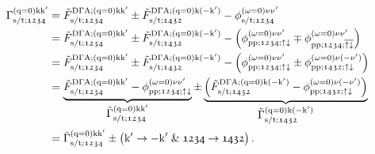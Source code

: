 \documentclass[main.tex]{subfiles}
\begin{document}
\begin{align}
\begin{split}
	\Gamma_{\text{s}/\text{t};\mathfrak{1234}}^{(\text{q}=0)\text{k}\text{k}'}&=\tilde{F}_{\text{s}/\text{t};\mathfrak{1234}}^{\text{D}\Gamma\text{A};(\text{q}=0)\text{k}\text{k}'}\pm \tilde{F}_{\text{s}/\text{t};\mathfrak{1432}}^{\text{D}\Gamma\text{A};(\text{q}=0)\text{k}(-\text{k}')}-\phi_{\text{s}/\text{t};\mathfrak{1234}}^{(\omega=0)\nu\nu'}\\
	&=\tilde{F}_{\text{s}/\text{t};\mathfrak{1234}}^{\text{D}\Gamma\text{A};(\text{q}=0)\text{k}\text{k}'}\pm \tilde{F}_{\text{s}/\text{t};\mathfrak{1432}}^{\text{D}\Gamma\text{A};(\text{q}=0)\text{k}(-\text{k}')}-\left (\phi_{\text{pp};\mathfrak{1234};\uparrow\downarrow}^{(\omega=0)\nu\nu'}\mp \phi_{\text{pp};\mathfrak{1234};\overline{\uparrow\downarrow}}^{(\omega=0)\nu\nu'}\right )\\
	&=\tilde{F}_{\text{s}/\text{t};\mathfrak{1234}}^{\text{D}\Gamma\text{A};(\text{q}=0)\text{k}\text{k}'}\pm \tilde{F}_{\text{s}/\text{t};\mathfrak{1432}}^{\text{D}\Gamma\text{A};(\text{q}=0)\text{k}(-\text{k}')}-\left (\phi_{\text{pp};\mathfrak{1234};\uparrow\downarrow}^{(\omega=0)\nu\nu'}\pm \phi_{\text{pp};\mathfrak{1432};\uparrow\downarrow}^{(\omega=0)\nu(-\nu')}\right )\\
	&=\underbrace{\tilde{F}_{\text{s}/\text{t};\mathfrak{1234}}^{\text{D}\Gamma\text{A};(\text{q}=0)\text{k}\text{k}'}-\phi_{\text{pp};\mathfrak{1234};\uparrow\downarrow}^{(\omega=0)\nu\nu'}}_{\textstyle\tilde{\Gamma}_{\text{s}/\text{t};\mathfrak{1234}}^{(\text{q}=0)\text{k}\text{k}'}}\pm \underbrace{\left (\tilde{F}_{\text{s}/\text{t};\mathfrak{1432}}^{\text{D}\Gamma\text{A};(\text{q}=0)\text{k}(-\text{k}')}- \phi_{\text{pp};\mathfrak{1432};\uparrow\downarrow}^{(\omega=0)\nu(-\nu')}\right )}_{\textstyle\tilde{\Gamma}_{\text{s}/\text{t};\mathfrak{1432}}^{(\text{q}=0)\text{k}(-\text{k}')}}\\
	&=\tilde{\Gamma}_{\text{s}/\text{t};\mathfrak{1234}}^{(\text{q}=0)\text{k}\text{k}'}\pm \left (\text{k}'\rightarrow -\text{k}'\;\&\; \mathfrak{1234}\rightarrow\mathfrak{1432}\right ).
\end{split}
\end{align}

\newpage
\end{document}
